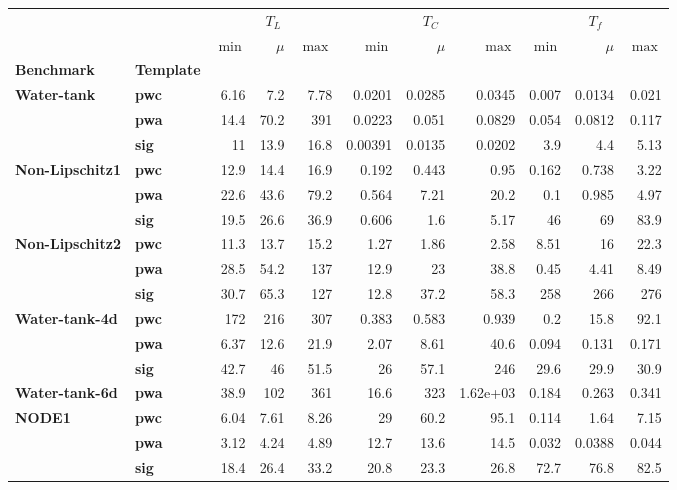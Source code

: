 \begin{tabular}{llrrrrrrrrr}
\toprule
      &     & \multicolumn{3}{c}{$T_L$} & \multicolumn{3}{c}{$T_C$} & \multicolumn{3}{c}{$T_f$} \\
      &     & $\min$ & $\mu$ & $\max$ &  $\min$ &  $\mu$ &   $\max$ & $\min$ &  $\mu$ & $\max$ \\
\textbf{Benchmark} & \textbf{Template} &        &       &        &         &        &          &        &        &        \\
\midrule
\textbf{Water-tank} & \textbf{pwc} &   6.16 &   7.2 &   7.78 &  0.0201 & 0.0285 &   0.0345 &  0.007 & 0.0134 &  0.021 \\
      & \textbf{pwa} &   14.4 &  70.2 &    391 &  0.0223 &  0.051 &   0.0829 &  0.054 & 0.0812 &  0.117 \\
      & \textbf{sig} &     11 &  13.9 &   16.8 & 0.00391 & 0.0135 &   0.0202 &    3.9 &    4.4 &   5.13 \\
\textbf{Non-Lipschitz1} & \textbf{pwc} &   12.9 &  14.4 &   16.9 &   0.192 &  0.443 &     0.95 &  0.162 &  0.738 &   3.22 \\
      & \textbf{pwa} &   22.6 &  43.6 &   79.2 &   0.564 &   7.21 &     20.2 &    0.1 &  0.985 &   4.97 \\
      & \textbf{sig} &   19.5 &  26.6 &   36.9 &   0.606 &    1.6 &     5.17 &     46 &     69 &   83.9 \\
\textbf{Non-Lipschitz2} & \textbf{pwc} &   11.3 &  13.7 &   15.2 &    1.27 &   1.86 &     2.58 &   8.51 &     16 &   22.3 \\
      & \textbf{pwa} &   28.5 &  54.2 &    137 &    12.9 &     23 &     38.8 &   0.45 &   4.41 &   8.49 \\
      & \textbf{sig} &   30.7 &  65.3 &    127 &    12.8 &   37.2 &     58.3 &    258 &    266 &    276 \\
\textbf{Water-tank-4d} & \textbf{pwc} &    172 &   216 &    307 &   0.383 &  0.583 &    0.939 &    0.2 &   15.8 &   92.1 \\
      & \textbf{pwa} &   6.37 &  12.6 &   21.9 &    2.07 &   8.61 &     40.6 &  0.094 &  0.131 &  0.171 \\
      & \textbf{sig} &   42.7 &    46 &   51.5 &      26 &   57.1 &      246 &   29.6 &   29.9 &   30.9 \\
\textbf{Water-tank-6d} & \textbf{pwa} &   38.9 &   102 &    361 &    16.6 &    323 & 1.62e+03 &  0.184 &  0.263 &  0.341 \\
\textbf{NODE1} & \textbf{pwc} &   6.04 &  7.61 &   8.26 &      29 &   60.2 &     95.1 &  0.114 &   1.64 &   7.15 \\
      & \textbf{pwa} &   3.12 &  4.24 &   4.89 &    12.7 &   13.6 &     14.5 &  0.032 & 0.0388 &  0.044 \\
      & \textbf{sig} &   18.4 &  26.4 &   33.2 &    20.8 &   23.3 &     26.8 &   72.7 &   76.8 &   82.5 \\
\bottomrule
\end{tabular}
